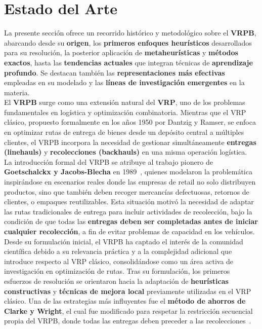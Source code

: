 \documentclass[letter, 10pt]{article}
\begin{document}
\section{Estado del Arte}

La presente secci\'on ofrece un recorrido hist\'orico y metodol\'ogico sobre el \textbf{VRPB}, abarcando desde su \textbf{origen}, los \textbf{primeros enfoques heur\'isticos} desarrollados para su resoluci\'on, la posterior aplicaci\'on de \textbf{metaheur\'isticas} y \textbf{m\'etodos exactos}, hasta las \textbf{tendencias actuales} que integran t\'ecnicas de \textbf{aprendizaje profundo}. Se destacan tambi\'en las \textbf{representaciones m\'as efectivas} empleadas en su modelado y las \textbf{l\'ineas de investigaci\'on emergentes} en la materia.\\

El \textbf{VRPB} surge como una extensi\'on natural del \textbf{VRP}, uno de los problemas fundamentales en log\'istica y optimizaci\'on combinatoria. Mientras que el VRP cl\'asico, propuesto formalmente en los a\~nos 1950 por Dantzig y Ramser, se enfoca en optimizar rutas de entrega de bienes desde un dep\'osito central a m\'ultiples clientes, el VRPB incorpora la necesidad de gestionar simult\'aneamente \textbf{entregas (linehauls)} y \textbf{recolecciones (backhauls)} en una misma operaci\'on log\'istica.\\

La introducci\'on formal del VRPB se atribuye al trabajo pionero de \textbf{Goetschalckx y Jacobs-Blecha} en 1989~\cite{goetschalckx1989vehicle}, quienes modelaron la problem\'atica inspir\'andose en escenarios reales donde las empresas de retail no solo distribuyen productos, sino que tambi\'en deben recoger mercanc\'ias defectuosas, retornos de clientes, o empaques reutilizables. Esta situaci\'on motiv\'o la necesidad de adaptar las rutas tradicionales de entrega para incluir actividades de recolecci\'on, bajo la condici\'on de que todas las \textbf{entregas deben ser completadas antes de iniciar cualquier recolecci\'on}, a fin de evitar problemas de capacidad en los veh\'iculos.\\

Desde su formulaci\'on inicial, el VRPB ha captado el inter\'es de la comunidad cient\'ifica debido a su relevancia pr\'actica y a la complejidad adicional que introduce respecto al VRP cl\'asico, consolid\'andose como un \'area activa de investigaci\'on en optimizaci\'on de rutas. Tras su formulaci\'on, los primeros esfuerzos de resoluci\'on se orientaron hacia la adaptaci\'on de \textbf{heur\'isticas constructivas} y \textbf{t\'ecnicas de mejora local} previamente utilizadas en el VRP cl\'asico. Una de las estrategias m\'as influyentes fue el \textbf{m\'etodo de ahorros de Clarke y Wright}, el cual fue modificado para respetar la restricci\'on secuencial propia del VRPB, donde todas las entregas deben preceder a las recolecciones~\cite{goetschalckx1989vehicle}.\\
\end{document}
